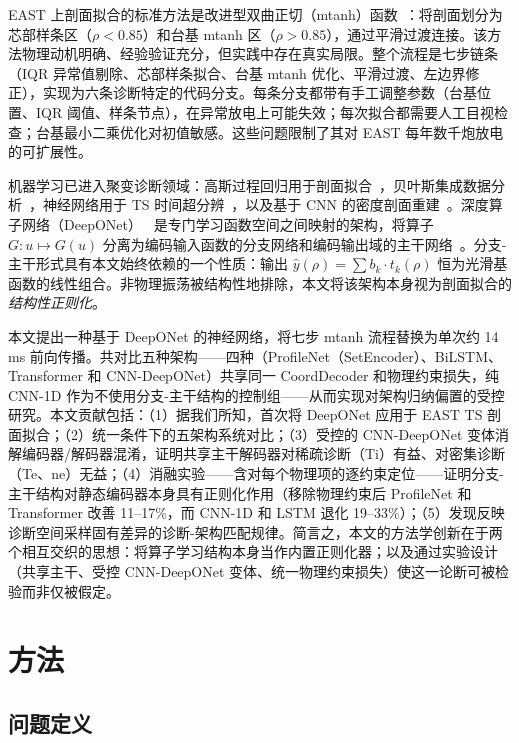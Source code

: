 \documentclass[a4paper,12pt]{ctexart}
\begin{document}
EAST 上剖面拟合的标准方法是改进型双曲正切（mtanh）函数~\cite{mtanh_groebner}：将剖面划分为芯部样条区（$\rho < 0.85$）和台基 mtanh 区（$\rho > 0.85$），通过平滑过渡连接。该方法物理动机明确、经验验证充分，但实践中存在真实局限。整个流程是七步链条（IQR 异常值剔除、芯部样条拟合、台基 mtanh 优化、平滑过渡、左边界修正），实现为六条诊断特定的代码分支。每条分支都带有手工调整参数（台基位置、IQR 阈值、样条节点），在异常放电上可能失效；每次拟合都需要人工目视检查；台基最小二乘优化对初值敏感。这些问题限制了其对 EAST 每年数千炮放电的可扩展性。

机器学习已进入聚变诊断领域：高斯过程回归用于剖面拟合~\cite{gpr_profiles,gpr_review}，贝叶斯集成数据分析~\cite{ida_east}，神经网络用于 TS 时间超分辨~\cite{diag2diag}，以及基于 CNN 的密度剖面重建~\cite{lan_cnn_east}。深度算子网络（DeepONet）~\cite{deeponet} 是专门学习函数空间之间映射的架构，将算子 $G: u \mapsto G(u)$ 分离为编码输入函数的分支网络和编码输出域的主干网络~\cite{physics_informed_deeponet,pinn_review}。分支-主干形式具有本文始终依赖的一个性质：输出 $\hat{y}(\rho) = \sum b_k \cdot t_k(\rho)$ 恒为光滑基函数的线性组合。非物理振荡被结构性地排除，本文将该架构本身视为剖面拟合的\textit{结构性正则化}。

本文提出一种基于 DeepONet 的神经网络，将七步 mtanh 流程替换为单次约 14 ms 前向传播。共对比五种架构——四种（ProfileNet（SetEncoder）、BiLSTM、Transformer 和 CNN-DeepONet）共享同一 CoordDecoder 和物理约束损失，纯 CNN-1D 作为不使用分支-主干结构的控制组——从而实现对架构归纳偏置的受控研究。本文贡献包括：（1）据我们所知，首次将 DeepONet 应用于 EAST TS 剖面拟合；（2）统一条件下的五架构系统对比；（3）受控的 CNN-DeepONet 变体消解编码器/解码器混淆，证明共享主干解码器对稀疏诊断（Ti）有益、对密集诊断（Te、ne）无益；（4）消融实验——含对每个物理项的逐约束定位——证明分支-主干结构对静态编码器本身具有正则化作用（移除物理约束后 ProfileNet 和 Transformer 改善 11--17\%，而 CNN-1D 和 LSTM 退化 19--33\%）；（5）发现反映诊断空间采样固有差异的诊断-架构匹配规律。简言之，本文的方法学创新在于两个相互交织的思想：将算子学习结构本身当作内置正则化器；以及通过实验设计（共享主干、受控 CNN-DeepONet 变体、统一物理约束损失）使这一论断可被检验而非仅被假定。

\section{方法}

\subsection{问题定义}
\end{document}
